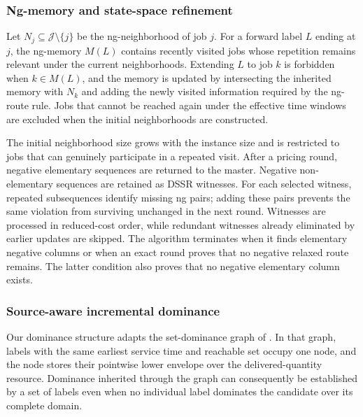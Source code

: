 \subsubsection{Ng-memory and state-space refinement}

Let $N_j\subseteq\mathcal J\setminus\{j\}$ be the ng-neighborhood of job $j$. For a
forward label $L$ ending at $j$, the ng-memory $M(L)$ contains recently visited
jobs whose repetition remains relevant under the current neighborhoods. Extending
$L$ to job $k$ is forbidden when $k\in M(L)$, and the memory is updated by
intersecting the inherited memory with $N_k$ and adding the newly visited
information required by the ng-route rule. Jobs that cannot be reached again under
the effective time windows are excluded when the initial neighborhoods are
constructed.

The initial neighborhood size grows with the instance size and is restricted to
jobs that can genuinely participate in a repeated visit. After a pricing round,
negative elementary sequences are returned to the master. Negative non-elementary
sequences are retained as DSSR witnesses. For each selected witness, repeated
subsequences identify missing ng pairs; adding these pairs prevents the same
violation from surviving unchanged in the next round. Witnesses are processed in
reduced-cost order, while redundant witnesses already eliminated by earlier
updates are skipped. The algorithm terminates when it finds elementary negative
columns or when an exact round proves that no negative relaxed route remains. The
latter condition also proves that no negative elementary column exists.

\subsubsection{Source-aware incremental dominance}

Our dominance structure adapts the set-dominance graph of
\citet{luo2017dominance}. In that graph, labels with the same earliest service
time and reachable set occupy one node, and the node stores their pointwise lower
envelope over the delivered-quantity resource. Dominance inherited through the
graph can consequently be established by a set of labels even when no individual
label dominates the candidate over its complete domain.


